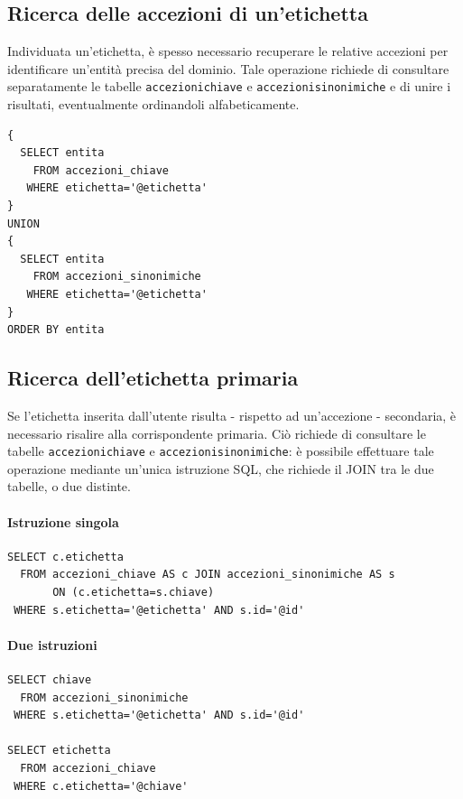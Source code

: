 \documentclass[10pt,a4paper,headinclude,footinclude,hidelinks]{scrreprt} %
\begin{document}
	\subsection{Ricerca delle accezioni di un'etichetta}
	\label{ch:stage:er:operazioni:etichette:accezioni}
	Individuata un'etichetta, è spesso necessario recuperare le relative accezioni per identificare un'entità precisa del dominio. Tale operazione richiede di consultare separatamente le tabelle \texttt{accezioni\textunderscore chiave} e \texttt{accezioni\textunderscore sinonimiche} e di unire i risultati, eventualmente ordinandoli alfabeticamente.

\begin{verbatim}
{
  SELECT entita
    FROM accezioni_chiave	
   WHERE etichetta='@etichetta'
}
UNION
{
  SELECT entita
    FROM accezioni_sinonimiche	
   WHERE etichetta='@etichetta'
}
ORDER BY entita
\end{verbatim}

	\subsection{Ricerca dell'etichetta primaria}
	\label{ch:stage:er:operazioni:etichette:ricerca-primaria}
	Se l'etichetta inserita dall'utente risulta - rispetto ad un'accezione - secondaria, è necessario risalire alla corrispondente primaria. Ciò richiede di consultare le tabelle \texttt{accezioni\textunderscore chiave} e \texttt{accezioni\textunderscore sinonimiche}: è possibile effettuare tale operazione mediante un'unica istruzione SQL, che richiede il JOIN tra le due tabelle, o due distinte.

\paragraph{Istruzione singola}
\begin{verbatim}
SELECT c.etichetta
  FROM accezioni_chiave AS c JOIN accezioni_sinonimiche AS s
       ON (c.etichetta=s.chiave)
 WHERE s.etichetta='@etichetta' AND s.id='@id'
\end{verbatim}

\paragraph{Due istruzioni}
\begin{verbatim}
SELECT chiave
  FROM accezioni_sinonimiche	
 WHERE s.etichetta='@etichetta' AND s.id='@id'

SELECT etichetta
  FROM accezioni_chiave	
 WHERE c.etichetta='@chiave'
\end{verbatim}
\end{document}
